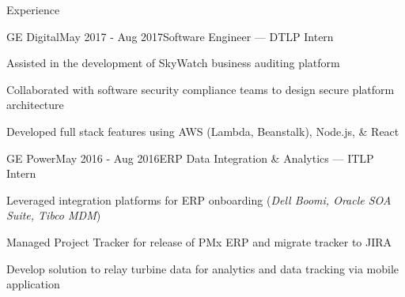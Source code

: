\documentclass{resume} %
\begin{document}
\begin{rSection}{Experience}
\begin{rSubsection}{GE Digital}{May 2017 - Aug 2017}{Software Engineer --- DTLP Intern}{}
\setlength{\itemindent}{.25in}
\item Assisted in the development of SkyWatch business auditing platform
\item Collaborated with software security compliance teams to design secure platform architecture
\item Developed full stack features using AWS (Lambda, Beanstalk), Node.js, \& React
\end{rSubsection}

\begin{rSubsection}{GE Power}{May 2016 - Aug 2016}{ERP Data Integration \& Analytics --- ITLP Intern}{}
\setlength{\itemindent}{.25in}
\item Leveraged integration platforms for ERP onboarding (\textit{Dell Boomi, Oracle SOA Suite, Tibco MDM})
\item Managed Project Tracker for release of PMx ERP and migrate tracker to JIRA
\item Develop solution to relay turbine data for analytics and data tracking via mobile application
\end{rSubsection}

\end{rSection}




 
\end{document}
